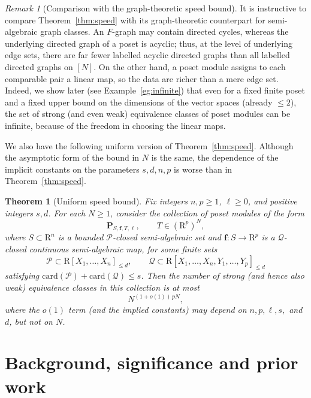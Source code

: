 \documentclass{amsart}[10pts]
\newtheorem{theorem}{Theorem}
\theoremstyle{definition}
\theoremstyle{remark}
\newtheorem{remark}{Remark}
\theoremstyle{observation}
\numberwithin{equation}{section}
\newcommand {\R} {\mathrm{R}}
\newcommand{\card}{\mathrm{card}}
\begin{document}
\begin{remark}[Comparison with the graph-theoretic speed bound]
\label{rem:comparison}
It is instructive to compare Theorem~\ref{thm:speed} with its graph-theoretic counterpart for semi-algebraic graph classes. 
An $F$-graph may contain directed cycles, whereas the underlying directed graph of a poset is acyclic; thus, at the level of underlying edge sets, there are far fewer labelled acyclic directed graphs than all labelled directed graphs on $[N]$. 
On the other hand, a poset module assigns to each comparable pair a linear map, so the data are richer than a mere edge set.
Indeed, we show later (see Example~\ref{eg:infinite}) that even for a fixed finite poset and a fixed upper bound on the dimensions of the vector spaces (already $\le 2$), the set of strong (and even weak) equivalence classes of poset modules can be infinite, because of the freedom in choosing the linear maps.
\end{remark}


We also have the following uniform version of Theorem~\ref{thm:speed}. 
Although the asymptotic form of the bound in $N$ is the same, the dependence of the implicit constants on the parameters $s,d,n,p$ is worse than in Theorem~\ref{thm:speed}.

\begin{theorem}[Uniform speed bound]
\label{thm:speed:uniform}
Fix integers $n,p\ge 1$, $\ell\ge 0$, and positive integers $s,d$.
For each $N\ge 1$, consider the collection of poset modules of the form
\[
\mathbf P_{S,\mathbf f,T,\ell},
\qquad T\in(\R^p)^N,
\]
where $S\subset \R^n$ is a bounded $\mathcal P$-closed semi-algebraic set and $\mathbf f:S\to \R^p$ is a $\mathcal Q$-closed continuous semi-algebraic map, for some finite sets
\[
\mathcal P\subset \R[X_1,\ldots,X_n]_{\le d},
\qquad
\mathcal Q\subset \R[X_1,\ldots,X_n,Y_1,\ldots,Y_p]_{\le d}
\]
satisfying $\card(\mathcal P)+\card(\mathcal Q)\le s$.
Then the number of \emph{strong} (and hence also weak)
equivalence classes in this collection is at most
\[
N^{(1+o(1))\,pN},
\]
where the $o(1)$ term (and the implied constants) may depend on $n,p,\ell,s,$ and $d$, but not on $N$.
\end{theorem}


 
	







\section{Background, significance and prior work}
\label{sec:background}
\end{document}
